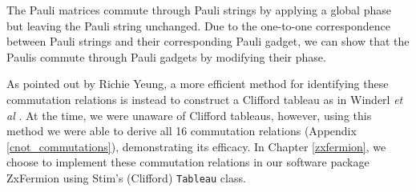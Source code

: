 The Pauli matrices commute through Pauli strings by applying a global phase but leaving the Pauli string unchanged. Due to the one-to-one correspondence between Pauli strings and their corresponding Pauli gadget, we can show that the Paulis commute through Pauli gadgets by modifying their phase.


As pointed out by Richie Yeung, a more efficient method for identifying these commutation relations is instead to construct a Clifford tableau as in Winderl \textit{et al} \cite{Yeung2023}. At the time, we were unaware of Clifford tableaus, however, using this method we were able to derive all 16 commutation relations (Appendix \ref{cnot_commutations}), demonstrating its efficacy. In Chapter \ref{zxfermion}, we choose to implement these commutation relations in our software package ZxFermion using Stim's (Clifford) \lstinline{Tableau} class.
